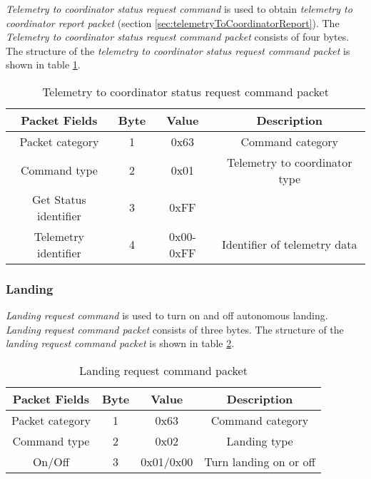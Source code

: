 \textit{Telemetry to coordinator status request command} is used to obtain \textit{telemetry to coordinator report packet} (section \ref{sec:telemetryToCoordinatorReport}).  The \textit{Telemetry to coordinator status request command packet} consists of four bytes. The structure of the \textit{telemetry to coordinator status request command packet} is shown in table \ref{tab:telemetryToCoordinatorStatusRequestPacket}.
\begin{table}[h]
\begin{center}
\begin{tabular}{c c c c}
\toprule
\rowcolor[HTML]{FFFC9E} 
\textbf{Packet Fields} & \textbf{Byte} & \textbf{Value} & \textbf{Description}          \\ \midrule
Packet category        & 1             & 0x63                & Command category              \\ [1ex]
Command type           & 2             & 0x01                & Telemetry to coordinator type \\ [1ex]
Get Status identifier  & 3             & 0xFF                &                               \\ [1ex]
Telemetry identifier   & 4             & 0x00-0xFF           & Identifier of telemetry data  \\ [1ex] \bottomrule
\end{tabular}
\end{center}
\caption{Telemetry to coordinator status request command packet}
\label{tab:telemetryToCoordinatorStatusRequestPacket}
\end{table}


\subsubsection{Landing}
\label{sec:landingCommand}
\textit{Landing request command} is used to turn on and off autonomous landing. \textit{Landing request command packet} consists of three bytes. The structure of the \textit{landing request command packet} is shown in table \ref{tab:landingRequestCommandPacket}.
\begin{table}[h]
\begin{center}
\begin{tabular}{c c c c}
\toprule
\rowcolor[HTML]{FFFC9E} 
\textbf{Packet Fields} & \textbf{Byte} & \textbf{Value} & \textbf{Description}   \\ \midrule
Packet category        & 1             & 0x63                & Command category       \\ [1ex]
Command type           & 2             & 0x02                & Landing type           \\ [1ex]
On/Off                 & 3             & 0x01/0x00           & Turn landing on or off \\ [1ex]
\bottomrule
\end{tabular}
\end{center}
\caption{Landing request command packet}
\label{tab:landingRequestCommandPacket}
\end{table}


